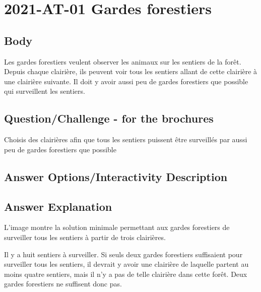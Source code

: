 \documentclass[a4paper,11pt]{report}
\newcommand{\taskGraphicsFolder}{..}
\begin{document}
\section*{\centering{} 2021-AT-01 Gardes forestiers}


\subsection*{Body}

Les gardes forestiers veulent observer les animaux sur les sentiers de la forêt. Depuis chaque clairière, ils peuvent voir tous les sentiers allant de cette clairière à une clairière suivante. Il doit y avoir aussi peu de gardes forestiers que possible qui surveillent les sentiers.

{\em


\subsection*{Question/Challenge - for the brochures}

Choisis des clairières afin que tous les sentiers puissent être surveillés par aussi peu de gardes forestiers que possible

{\centering%
\par}

}

\begingroup
\renewcommand{\arraystretch}{1.5}
\subsection*{Answer Options/Interactivity Description}



\endgroup

\subsection*{Answer Explanation}

L’image montre la solution minimale permettant aux gardes forestiers de surveiller tous les sentiers à partir de trois clairières.

{\centering%
\par}

Il y a huit sentiers à surveiller. Si seuls deux gardes forestiers suffisaient pour surveiller tous les sentiers, il devrait y avoir une clairière de laquelle partent au moins quatre sentiers, mais il n’y a pas de telle clairière dans cette forêt. Deux gardes forestiers ne suffisent donc pas.
\end{document}
